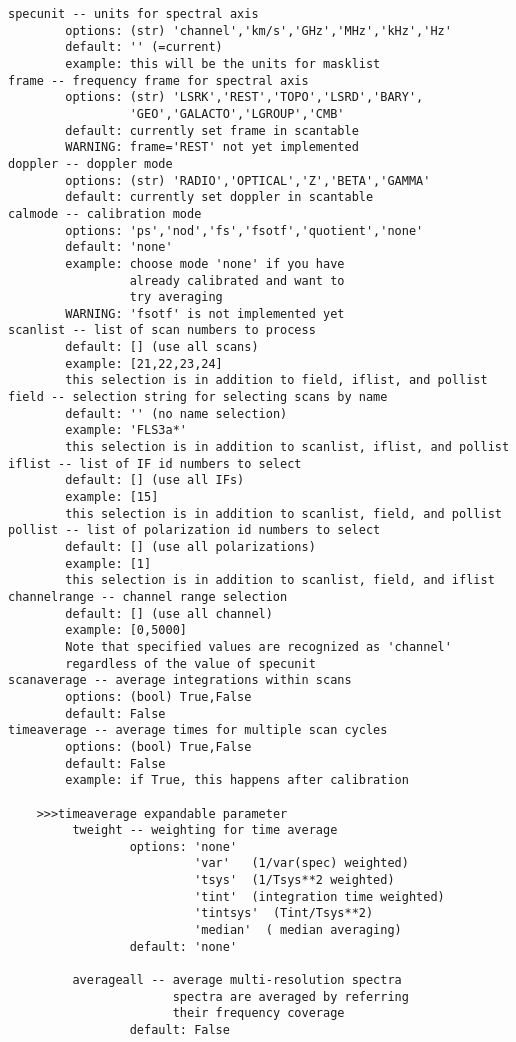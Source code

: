 \begin{verbatim}
specunit -- units for spectral axis
        options: (str) 'channel','km/s','GHz','MHz','kHz','Hz'
        default: '' (=current)
        example: this will be the units for masklist
frame -- frequency frame for spectral axis
        options: (str) 'LSRK','REST','TOPO','LSRD','BARY',
                 'GEO','GALACTO','LGROUP','CMB'
        default: currently set frame in scantable
        WARNING: frame='REST' not yet implemented
doppler -- doppler mode
        options: (str) 'RADIO','OPTICAL','Z','BETA','GAMMA'
        default: currently set doppler in scantable
calmode -- calibration mode
        options: 'ps','nod','fs','fsotf','quotient','none'
        default: 'none'
        example: choose mode 'none' if you have
                 already calibrated and want to
                 try averaging
        WARNING: 'fsotf' is not implemented yet
scanlist -- list of scan numbers to process
        default: [] (use all scans)
        example: [21,22,23,24]
        this selection is in addition to field, iflist, and pollist
field -- selection string for selecting scans by name
        default: '' (no name selection)
        example: 'FLS3a*'
        this selection is in addition to scanlist, iflist, and pollist
iflist -- list of IF id numbers to select
        default: [] (use all IFs)
        example: [15]
        this selection is in addition to scanlist, field, and pollist
pollist -- list of polarization id numbers to select
        default: [] (use all polarizations)
        example: [1]
        this selection is in addition to scanlist, field, and iflist
channelrange -- channel range selection
        default: [] (use all channel)
        example: [0,5000]
        Note that specified values are recognized as 'channel' 
        regardless of the value of specunit 
scanaverage -- average integrations within scans
        options: (bool) True,False
        default: False
timeaverage -- average times for multiple scan cycles
        options: (bool) True,False
        default: False
        example: if True, this happens after calibration

    >>>timeaverage expandable parameter
         tweight -- weighting for time average
                 options: 'none' 
                          'var'   (1/var(spec) weighted)
                          'tsys'  (1/Tsys**2 weighted)
                          'tint'  (integration time weighted)
                          'tintsys'  (Tint/Tsys**2)
                          'median'  ( median averaging)
                 default: 'none'

         averageall -- average multi-resolution spectra
                       spectra are averaged by referring 
                       their frequency coverage
                 default: False


\end{verbatim}
